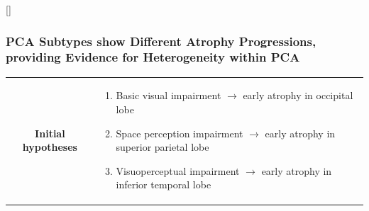 \documentclass[8pt,xcolor=table]{beamer}
\begin{document}
\makeatletter
{}[]{}
\makeatother


\begin{frame}
\frametitle{PCA Subtypes show Different Atrophy Progressions, providing Evidence for Heterogeneity within PCA}

\vspace{-1em}
\begin{tabular}{c p{10cm}}
 \textbf{Initial hypotheses} & \begin{minipage}[c]{0.8\textwidth} \begin{enumerate}
 \item Basic visual impairment $\rightarrow$ early atrophy in occipital lobe
 \item Space perception impairment $\rightarrow$ early atrophy in superior parietal lobe
 \item Visuoperceptual impairment $\rightarrow$ early atrophy in inferior temporal lobe
\end{enumerate} \end{minipage}
\end{tabular}


\begin{figure}[H]
  \begin{subfigure}[t]{0.12\textwidth}
  \end{subfigure}
  \hspace{-1.5em}
  ~
    \begin{tikzpicture}[scale=\scaleAllSubfigsPcaSubgrTikz,auto,swap]


\end{tikzpicture}
\end{figure}
\end{frame}
\end{document}

